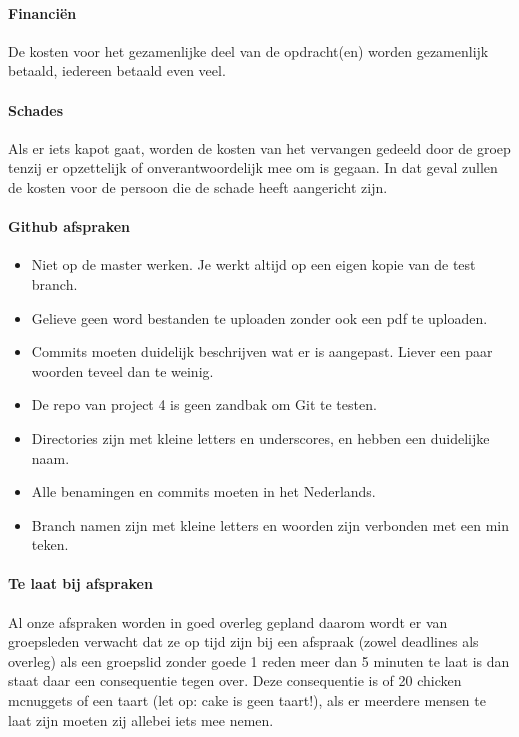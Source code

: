 \documentclass{article}
\begin{document}
\paragraph{Financi\"en}

De kosten voor het gezamenlijke deel van de opdracht(en) worden gezamenlijk betaald, iedereen betaald even veel.

\paragraph{Schades}

Als er iets kapot gaat, worden de kosten van het vervangen gedeeld door de groep tenzij er opzettelijk of onverantwoordelijk mee om is gegaan.
In dat geval zullen de kosten voor de persoon die de schade heeft aangericht zijn.

\paragraph{Github afspraken}

\begin{itemize}
\item Niet op de master werken. Je werkt altijd op een eigen kopie van de test branch.
\item Gelieve geen word bestanden te uploaden zonder ook een pdf te uploaden.
\item Commits moeten duidelijk beschrijven wat er is aangepast. Liever een paar woorden teveel dan te weinig.
\item De repo van project 4 is geen zandbak om Git te testen.
\item Directories zijn met kleine letters en underscores, en hebben een duidelijke naam.
\item Alle benamingen en commits moeten in het Nederlands.
\item Branch namen zijn met kleine letters en woorden zijn verbonden met een min teken.
\end{itemize}

\paragraph{Te laat bij afspraken}

Al onze afspraken worden in goed overleg gepland daarom wordt er van groepsleden verwacht
dat ze op tijd zijn bij een afspraak (zowel deadlines als overleg) als een groepslid zonder goede
1
reden meer dan 5 minuten te laat is dan staat daar een consequentie tegen over. Deze
consequentie is of 20 chicken mcnuggets of een taart (let op: cake is geen taart!), als er
meerdere mensen te laat zijn moeten zij allebei iets mee nemen.
\end{document}
